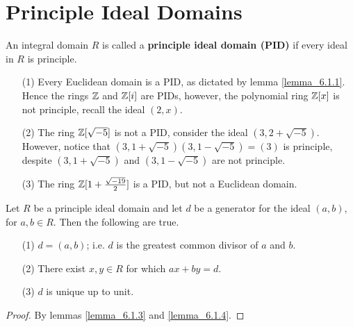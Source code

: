 \section{Principle Ideal Domains}
\label{section_6.2}

\begin{definition}
  An integral domain $R$ is called a \textbf{principle ideal domain (PID)} if
  every ideal in $R$ is principle.
\end{definition}

\begin{example}\label{example_6.4}
  \begin{enumerate}
    \item[(1)] Every Euclidean domain is a PID, as dictated by lemma
      \ref{lemma_6.1.1}. Hence the rings $\mathbb{Z}$ and  $\mathbb{Z}[i]$ are PIDs, however,
      the polynomial ring $\mathbb{Z}[x]$ is not principle, recall the ideal
      $(2,x)$.

    \item[(2)] The ring $\mathbb{Z}[\sqrt{-5}]$ is not a PID, consider the ideal
      $(3,2+\sqrt{-5})$. However, notice that
      $(3,1+\sqrt{-5})(3,1-\sqrt{-5})=(3)$ is principle, despite
      $(3,1+\sqrt{-5})$ and $(3,1-\sqrt{-5})$ are not principle.

    \item[(3)] The ring $\mathbb{Z}[1+\frac{\sqrt{-19}}{2}]$ is a PID, but not a
      Euclidean domain.
  \end{enumerate}
\end{example}

\begin{lemma}\label{lemma_6.6.1}
  Let $R$ be a principle ideal domain and let $d$ be a generator for the ideal
  $(a,b)$, for $a,b \in R$. Then the following are true.
  \begin{enumerate}
    \item[(1)] $d=(a,b)$; i.e. $d$ is the greatest common divisor of $a$ and
      $b$.

    \item[(2)] There exist $x,y \in R$ for which  $ax+by=d$.

    \item[(3)] $d$ is unique up to unit.
  \end{enumerate}
\end{lemma}
\begin{proof}
  By lemmas \ref{lemma_6.1.3} and \ref{lemma_6.1.4}.
\end{proof}

